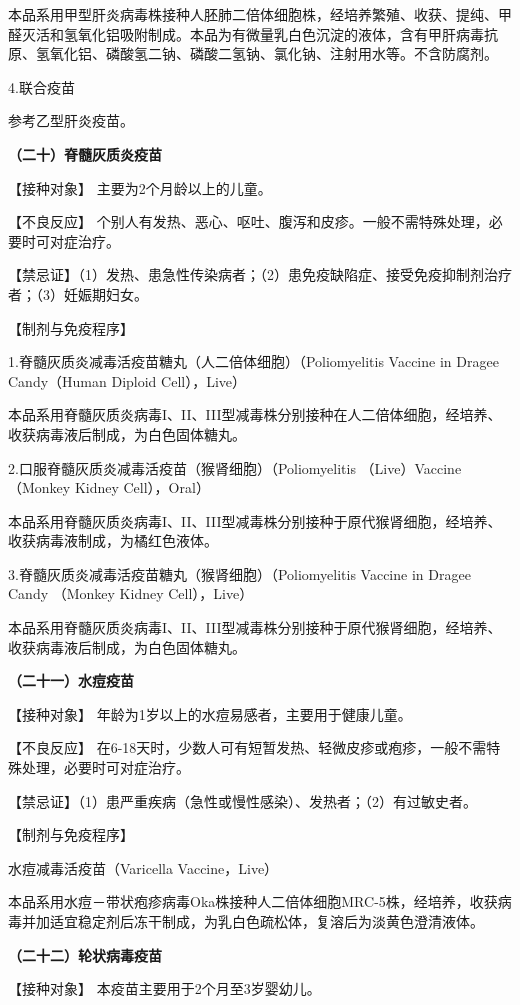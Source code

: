 本品系用甲型肝炎病毒株接种人胚肺二倍体细胞株，经培养繁殖、收获、提纯、甲醛灭活和氢氧化铝吸附制成。本品为有微量乳白色沉淀的液体，含有甲肝病毒抗原、氢氧化铝、磷酸氢二钠、磷酸二氢钠、氯化钠、注射用水等。不含防腐剂。

4.联合疫苗

参考乙型肝炎疫苗。

\textbf{（二十）脊髓灰质炎疫苗}

【接种对象】 主要为2个月龄以上的儿童。

【不良反应】
个别人有发热、恶心、呕吐、腹泻和皮疹。一般不需特殊处理，必要时可对症治疗。

【禁忌证】（1）发热、患急性传染病者；（2）患免疫缺陷症、接受免疫抑制剂治疗者；（3）妊娠期妇女。

【制剂与免疫程序】

1.脊髓灰质炎减毒活疫苗糖丸（人二倍体细胞）（Poliomyelitis Vaccine in
Dragee Candy（Human Diploid Cell），Live）

本品系用脊髓灰质炎病毒I、II、III型减毒株分别接种在人二倍体细胞，经培养、收获病毒液后制成，为白色固体糖丸。

2.口服脊髓灰质炎减毒活疫苗（猴肾细胞）（Poliomyelitis （Live）Vaccine
（Monkey Kidney Cell），Oral）

本品系用脊髓灰质炎病毒I、II、III型减毒株分别接种于原代猴肾细胞，经培养、收获病毒液制成，为橘红色液体。

3.脊髓灰质炎减毒活疫苗糖丸（猴肾细胞）（Poliomyelitis Vaccine in Dragee
Candy （Monkey Kidney Cell），Live）

本品系用脊髓灰质炎病毒I、II、III型减毒株分别接种于原代猴肾细胞，经培养、收获病毒液后制成，为白色固体糖丸。

\textbf{（二十一）水痘疫苗}

【接种对象】 年龄为1岁以上的水痘易感者，主要用于健康儿童。

【不良反应】
在6-18天时，少数人可有短暂发热、轻微皮疹或疱疹，一般不需特殊处理，必要时可对症治疗。

【禁忌证】（1）患严重疾病（急性或慢性感染）、发热者；（2）有过敏史者。

【制剂与免疫程序】

水痘减毒活疫苗（Varicella Vaccine，Live）

本品系用水痘－带状疱疹病毒Oka株接种人二倍体细胞MRC-5株，经培养，收获病毒并加适宜稳定剂后冻干制成，为乳白色疏松体，复溶后为淡黄色澄清液体。

\textbf{（二十二）轮状病毒疫苗}

【接种对象】 本疫苗主要用于2个月至3岁婴幼儿。

